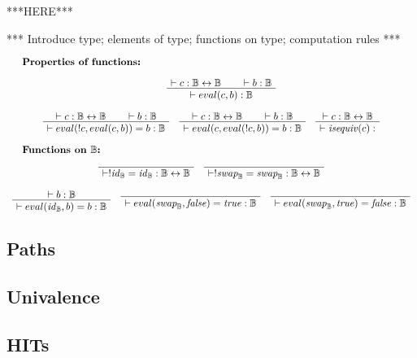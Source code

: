 \documentclass[format=acmlarge,review,natbib]{acmart}
\newcommand{\invc}[1]{!#1}
\newcommand{\evalone}[2]{eval(#1,#2)}
\newcommand{\isequiv}[1]{\mathit{isequiv}(#1)}
\newcommand{\idc}{\mathit{id}}
\newcommand{\swapc}{\mathit{swap}}
\newcommand{\iso}{\leftrightarrow}
\newcommand{\fc}{\mathit{false}}
\newcommand{\tc}{\mathit{true}}
\newcommand{\boolt}{\mathbb{B}}
\newcommand{\proves}{\vdash}
\newcommand{\jdg}[2]{\proves #1 : #2}
\begin{document}
\newpage

***HERE***

*** Introduce type; elements of type; functions on type; computation rules ***

\[\begin{array}{c}
    \noalign{\textbf{Properties of functions:}} \\
    \quad
    \quad
    \AxiomC{$\jdg{c}{\boolt\iso\boolt}$}
    \AxiomC{$\jdg{b}{\boolt}$}
    \BinaryInfC{$\jdg{\evalone{c}{b}}{\boolt}$}
    \DisplayProof
    \\
    \\
    \AxiomC{$\jdg{c}{\boolt\iso\boolt}$}
    \AxiomC{$\jdg{b}{\boolt}$}
    \BinaryInfC{$\jdg{\evalone{\invc{c}}{\evalone{c}{b}} = b}{\boolt}$}
    \DisplayProof
    \quad
    \AxiomC{$\jdg{c}{\boolt\iso\boolt}$}
    \AxiomC{$\jdg{b}{\boolt}$}
    \BinaryInfC{$\jdg{\evalone{c}{\evalone{\invc{c}}{b}} = b}{\boolt}$}
    \DisplayProof
    \quad
    \AxiomC{$\jdg{c}{\boolt\iso\boolt}$}
    \UnaryInfC{$\jdg{\isequiv{c}}{}$}
    \DisplayProof
    \\
    \\
    \noalign{\textbf{Functions on $\boolt$:}} \\
    \AxiomC{}
    \UnaryInfC{$\jdg{\invc{\idc_{\boolt} = \idc_{\boolt}}}{\boolt\iso\boolt}$}
    \DisplayProof
    \quad
    \AxiomC{}
    \UnaryInfC{$\jdg{\invc{\swapc _{\boolt}} = \swapc _{\boolt}}{\boolt\iso\boolt}$}
    \DisplayProof
    \\
    \\
    \AxiomC{$\jdg{b}{\boolt}$}
    \UnaryInfC{$\jdg{\evalone{\idc_{\boolt}}{b} = b}{\boolt}$}
    \DisplayProof
    \quad
    \AxiomC{}
    \UnaryInfC{$\jdg{\evalone{\swapc_{\boolt}}{\fc} = \tc}{\boolt}$}
    \DisplayProof
    \quad
    \AxiomC{}
    \UnaryInfC{$\jdg{\evalone{\swapc_{\boolt}}{\tc} = \fc}{\boolt}$}
    \DisplayProof
\end{array}\]

\subsection{Paths}

\subsection{Univalence}

\subsection{HITs}
\end{document}
